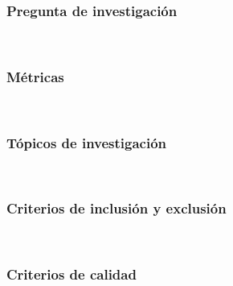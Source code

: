 \subsubsection{Pregunta de investigación}
\mbox{}\\

\subsubsection{Métricas}
\mbox{}\\

\subsubsection{Tópicos de investigación}
\mbox{}\\

\subsubsection{Criterios de inclusión y exclusión}
\mbox{}\\

\subsubsection{Criterios de calidad}
\mbox{}\\
